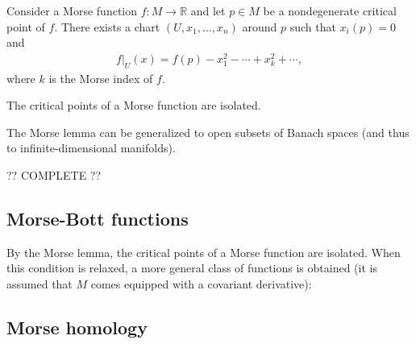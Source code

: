    \begin{property}
        Consider a Morse function $f:M\rightarrow\mathbb{R}$ and let $p\in M$ be a nondegenerate critical point of $f$. There exists a chart $(U,x_1,\ldots,x_n)$ around $p$ such that $x_i(p)=0$ and
        \begin{gather}
            f|_U(x) = f(p) - x_1^2-\cdots + x_k^2+\cdots,
        \end{gather}
        where $k$ is the Morse index of $f$.
    \end{property}
    \begin{result}
        The critical points of a Morse function are isolated.
    \end{result}
    \begin{remark}
        The Morse lemma can be generalized to open subsets of Banach spaces (and thus to infinite-dimensional manifolds).
    \end{remark}


    ?? COMPLETE ??

\subsection{Morse-Bott functions}

    By the Morse lemma, the critical points of a Morse function are isolated. When this condition is relaxed, a more general class of functions is obtained (it is assumed that $M$ comes equipped with a covariant derivative):

\subsection{Morse homology}\label{section:morse_homology}

